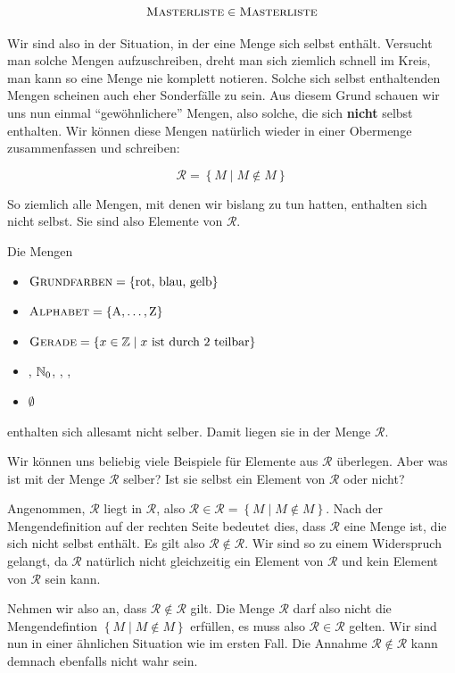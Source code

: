 \documentclass[../../main.tex]{subfiles}
\newcommand{\R}{\ensuremath{\mathcal{R}}\xspace}
\begin{document}
$$\textsc{Masterliste} \in \textsc{Masterliste}$$


Wir sind also in der Situation, in der eine Menge sich selbst enthält. Versucht man solche Mengen aufzuschreiben, dreht man sich ziemlich schnell im Kreis, man kann so eine Menge nie komplett notieren. Solche sich selbst enthaltenden Mengen scheinen auch eher Sonderfälle zu sein. Aus diesem Grund schauen wir uns nun einmal \enquote{gewöhnlichere} Mengen, also solche, die sich \textbf{nicht} selbst enthalten. Wir können diese Mengen natürlich wieder in einer Obermenge zusammenfassen und schreiben:

$$\R = \left\{ M \mid M \notin M \right\}$$

So ziemlich alle Mengen, mit denen wir bislang zu tun hatten, enthalten sich nicht selbst. Sie sind also Elemente von \R.

\begin{example}{}
	Die Mengen
	\begin{itemize}
		\item $\textsc{Grundfarben} = \left\{\text{rot, blau, gelb}\right\}$
		\item $\textsc{Alphabet} = \left\{\text{A},\ldots,\text{Z}\right\}$
		\item $\textsc{Gerade} = \left\{x \in \mathbb{Z} \mid x \text{ ist durch 2 teilbar}\right\}$
		\item \Natural, $\mathbb{N}_0$, \Integer, \Rational, \Real
		\item $\emptyset$
	\end{itemize}
	enthalten sich allesamt nicht selber. Damit liegen sie in der Menge \R.
\end{example}

Wir können uns beliebig viele Beispiele für Elemente aus \R überlegen. Aber was ist mit der Menge \R selber? Ist sie selbst ein Element von \R oder nicht?

Angenommen, \R liegt in \R, also $\R \in \R = \left\{ M \mid M \notin M \right\}$. Nach der Mengendefinition auf der rechten Seite bedeutet dies, dass \R eine Menge ist, die sich nicht selbst enthält. Es gilt also $\R \notin \R$. Wir sind so zu einem Widerspruch gelangt, da \R natürlich nicht gleichzeitig ein Element von \R und kein Element von \R sein kann.

Nehmen wir also an, dass $\R \notin \R$ gilt. Die Menge \R darf also nicht die Mengendefintion $\left\{ M \mid M \notin M \right\}$ erfüllen, es muss also $\R \in \R$ gelten. Wir sind nun in einer ähnlichen Situation wie im ersten Fall. Die Annahme $\R \notin \R$ kann demnach ebenfalls nicht wahr sein.
\end{document}
